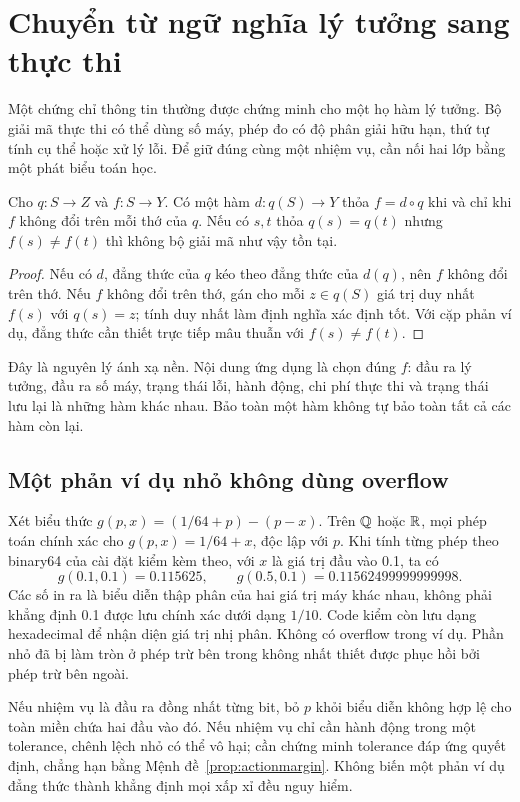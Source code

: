 \section{Chuyển từ ngữ nghĩa lý tưởng sang thực thi}\label{sec:semantics}
Một chứng chỉ thông tin thường được chứng minh cho một họ hàm lý tưởng. Bộ giải mã thực thi có thể dùng số máy, phép đo có độ phân giải hữu hạn, thứ tự tính cụ thể hoặc xử lý lỗi. Để giữ đúng cùng một nhiệm vụ, cần nối hai lớp bằng một phát biểu toán học.

\begin{theorem}\label{thm:semanticfactor}
Cho $q:S\to Z$ và $f:S\to Y$. Có một hàm $d:q(S)\to Y$ thỏa $f=d\circ q$ khi và chỉ khi $f$ không đổi trên mỗi thớ của $q$. Nếu có $s,t$ thỏa $q(s)=q(t)$ nhưng $f(s)\ne f(t)$ thì không bộ giải mã như vậy tồn tại.
\end{theorem}
\begin{proof}
Nếu có $d$, đẳng thức của $q$ kéo theo đẳng thức của $d(q)$, nên $f$ không đổi trên thớ. Nếu $f$ không đổi trên thớ, gán cho mỗi $z\in q(S)$ giá trị duy nhất $f(s)$ với $q(s)=z$; tính duy nhất làm định nghĩa xác định tốt. Với cặp phản ví dụ, đẳng thức cần thiết trực tiếp mâu thuẫn với $f(s)\ne f(t)$.
\end{proof}
Đây là nguyên lý ánh xạ nền. Nội dung ứng dụng là chọn đúng $f$: đầu ra lý tưởng, đầu ra số máy, trạng thái lỗi, hành động, chi phí thực thi và trạng thái lưu lại là những hàm khác nhau. Bảo toàn một hàm không tự bảo toàn tất cả các hàm còn lại.

\subsection{Một phản ví dụ nhỏ không dùng overflow}
Xét biểu thức $g(p,x)=(1/64+p)-(p-x)$. Trên $\mathbb Q$ hoặc $\mathbb R$, mọi phép toán chính xác cho $g(p,x)=1/64+x$, độc lập với $p$. Khi tính từng phép theo binary64 của cài đặt kiểm kèm theo, với $x$ là giá trị đầu vào 0.1, ta có
\[
g(0.1,0.1)=0.115625,
\qquad g(0.5,0.1)=0.11562499999999998.
\]
Các số in ra là biểu diễn thập phân của hai giá trị máy khác nhau, không phải khẳng định 0.1 được lưu chính xác dưới dạng $1/10$. Code kiểm còn lưu dạng hexadecimal để nhận diện giá trị nhị phân. Không có overflow trong ví dụ. Phần nhỏ đã bị làm tròn ở phép trừ bên trong không nhất thiết được phục hồi bởi phép trừ bên ngoài.

Nếu nhiệm vụ là đầu ra đồng nhất từng bit, bỏ $p$ khỏi biểu diễn không hợp lệ cho toàn miền chứa hai đầu vào đó. Nếu nhiệm vụ chỉ cần hành động trong một tolerance, chênh lệch nhỏ có thể vô hại; cần chứng minh tolerance đáp ứng quyết định, chẳng hạn bằng Mệnh đề~\ref{prop:actionmargin}. Không biến một phản ví dụ đẳng thức thành khẳng định mọi xấp xỉ đều nguy hiểm.

